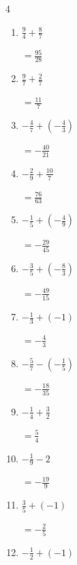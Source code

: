 \begin{multicols}{4}
\begin{enumerate}
        $\displaystyle =\frac{7}{9}$

  \item $\displaystyle \frac{9}{4} + \frac{8}{7}$

        $\displaystyle =\frac{95}{28}$

  \item $\displaystyle \frac{9}{7} + \frac{2}{7}$

        $\displaystyle =\frac{11}{7}$

  \item $\displaystyle -\frac{4}{7} + \left(-\frac{4}{3}\right)$

        $\displaystyle =-\frac{40}{21}$

  \item $\displaystyle -\frac{2}{9} + \frac{10}{7}$

        $\displaystyle =\frac{76}{63}$

  \item $\displaystyle -\frac{1}{5} + \left(-\frac{4}{9}\right)$

        $\displaystyle =-\frac{29}{45}$

  \item $\displaystyle -\frac{3}{5} + \left(-\frac{8}{3}\right)$

        $\displaystyle =-\frac{49}{15}$

  \item $\displaystyle -\frac{1}{3} + \left(-1\right)$

        $\displaystyle =-\frac{4}{3}$

  \item $\displaystyle -\frac{5}{7} - \left(-\frac{1}{5}\right)$

        $\displaystyle =-\frac{18}{35}$

\columnbreak %

  \item $\displaystyle -\frac{1}{4} + \frac{3}{2}$

        $\displaystyle =\frac{5}{4}$

  \item $\displaystyle -\frac{1}{9} - 2$

        $\displaystyle =-\frac{19}{9}$

  \item $\displaystyle \frac{3}{5} + \left(-1\right)$

        $\displaystyle =-\frac{2}{5}$

  \item $\displaystyle -\frac{1}{2} + \left(-1\right)$


\end{enumerate}
\end{multicols}
